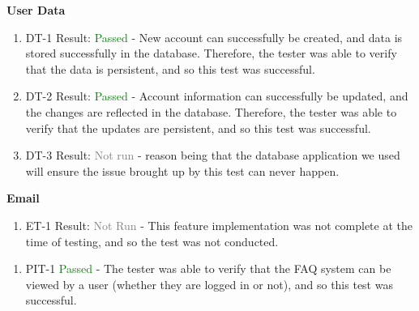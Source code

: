 \documentclass[12pt, titlepage]{article}
\begin{document}
\noindent\large{\textbf{User Data}}

\normalsize

\begin{enumerate}
  \item DT-1
        Result: \textcolor{green}{Passed} - New account can successfully be created, and data is stored successfully in the database. Therefore, the tester was able to verify that the data is
        persistent, and so this test was successful.
  \item DT-2
        Result: \textcolor{green}{Passed} - Account information can successfully be updated, and the changes are reflected in the database. Therefore, the tester was able to verify
        that the updates are persistent, and so this test was successful.
  \item DT-3
        Result: \textcolor{gray}{Not run} - reason being that the database application we used will ensure the issue brought up by this test can never happen.\\
\end{enumerate}

\noindent\large{\textbf{Email}}

\normalsize

\begin{enumerate}
  \item ET-1
        Result: \textcolor{gray}{Not Run} - This feature implementation was not complete at the time of testing, and so the test was not conducted.
\end{enumerate}


\normalsize

\begin{enumerate}
  \item PIT-1 \textcolor{green}{Passed} - The tester was able to verify that the FAQ system can be viewed by a user (whether they are logged in or not), and so this test was successful.\\
\end{enumerate}


\normalsize
\end{document}
